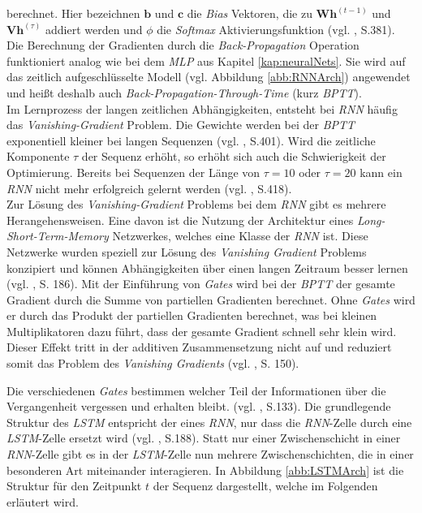 \documentclass[a4paper,11pt]{article}
\begin{document}
berechnet. Hier bezeichnen $\bm{b}$ und $\bm{c}$ die \textit{Bias} Vektoren, die zu $\bm{W} \bm{h}^{(t-1)} $ und $\bm{V}\bm{h}^{(\tau)} $ addiert werden und $\phi$ die \textit{Softmax} Aktivierungsfunktion (vgl. \cite{deepL}, S.381).\\ 
Die Berechnung der Gradienten durch die \textit{Back-Propagation} Operation funktioniert analog wie bei dem \textit{MLP} aus Kapitel \ref{kap:neuralNets}. Sie wird auf das zeitlich aufgeschlüsselte Modell (vgl. Abbildung \ref{abb:RNNArch}) angewendet und heißt deshalb auch \textit{Back-Propagation-Through-Time} (kurz \textit{BPTT}). \\
Im Lernprozess der langen zeitlichen Abhängigkeiten, entsteht bei \textit{RNN} häufig das \textit{Vanishing-Gradient} Problem.
Die Gewichte werden bei der \textit{BPTT} exponentiell kleiner bei langen Sequenzen (vgl. \cite{deepL}, S.401). Wird die zeitliche Komponente $\tau$ der Sequenz erhöht, so erhöht sich auch die Schwierigkeit der Optimierung.
Bereits bei Sequenzen der Länge von $\tau = 10$ oder $\tau = 20$ kann ein \textit{RNN} nicht mehr erfolgreich gelernt werden (vgl. \cite{deepL}, S.418).\\

Zur Lösung des \textit{Vanishing-Gradient} Problems bei dem \textit{RNN} gibt es mehrere Herangehensweisen. Eine davon ist die Nutzung der Architektur eines \textit{Long-Short-Term-Memory} Netzwerkes, welches eine Klasse der \textit{RNN} ist. Diese Netzwerke wurden speziell zur Lösung des \textit{Vanishing Gradient} Problems konzipiert und können Abhängigkeiten über einen langen Zeitraum besser lernen (vgl. \cite{keras}, S. 186). Mit der Einführung von \textit{Gates} wird bei der \textit{BPTT} der gesamte Gradient durch die Summe von partiellen Gradienten berechnet. Ohne \textit{Gates} wird er durch das Produkt der partiellen Gradienten berechnet, was bei kleinen Multiplikatoren dazu führt, dass der gesamte Gradient schnell sehr klein wird. Dieser Effekt tritt in der additiven Zusammensetzung nicht auf und reduziert somit das Problem des \textit{Vanishing Gradients} (vgl. \cite{deepEssentials}, S. 150).

Die verschiedenen \textit{Gates} bestimmen welcher Teil der Informationen über die Vergangenheit vergessen und erhalten bleibt. (vgl. \cite{deepNLP}, S.133). Die grundlegende Struktur des \textit{LSTM} entspricht der eines \textit{RNN}, nur dass die \textit{RNN}-Zelle durch eine \textit{LSTM}-Zelle ersetzt wird (vgl. \cite{keras}, S.188). Statt nur einer Zwischenschicht in einer \textit{RNN}-Zelle gibt es in der \textit{LSTM}-Zelle nun mehrere Zwischenschichten, die in einer besonderen Art miteinander interagieren. In Abbildung \ref{abb:LSTMArch} ist die Struktur für den Zeitpunkt $t$ der Sequenz dargestellt, welche im Folgenden erläutert wird.
\end{document}
